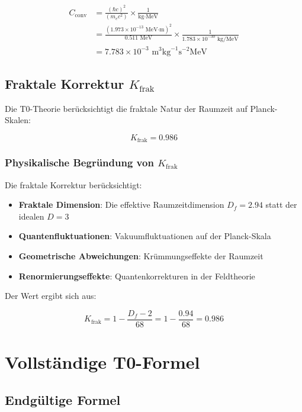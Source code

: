 \documentclass[12pt,a4paper]{article}
\newcommand{\Kfrak}{K_{\text{frak}}}
\newcommand{\Cconv}{C_{\text{conv}}}
\begin{document}
	\begin{align}
		\Cconv &= \frac{(\hbar c)^2}{(m_e c^2)} \times \frac{1}{\text{kg} \cdot \text{MeV}} \\
		&= \frac{(1.973 \times 10^{-13} \text{ MeV·m})^2}{0.511 \text{ MeV}} \times \frac{1}{1.783 \times 10^{-30} \text{ kg/MeV}} \\
		&= 7.783 \times 10^{-3} \text{ m}^3 \text{kg}^{-1} \text{s}^{-2} \text{MeV}
	\end{align}
	
	\subsection{Fraktale Korrektur $\Kfrak$}
	
	Die T0-Theorie berücksichtigt die fraktale Natur der Raumzeit auf Planck-Skalen:
	
	\begin{equation}
		\Kfrak = 0.986
	\end{equation}
	
	\subsubsection{Physikalische Begründung von $\Kfrak$}
	
	Die fraktale Korrektur berücksichtigt:
	
	\begin{itemize}
		\item \textbf{Fraktale Dimension}: Die effektive Raumzeitdimension $D_f = 2.94$ statt der idealen $D = 3$
		\item \textbf{Quantenfluktuationen}: Vakuumfluktuationen auf der Planck-Skala
		\item \textbf{Geometrische Abweichungen}: Krümmungseffekte der Raumzeit
		\item \textbf{Renormierungseffekte}: Quantenkorrekturen in der Feldtheorie
	\end{itemize}
	
	Der Wert ergibt sich aus:
	
	\begin{equation}
		\Kfrak = 1 - \frac{D_f - 2}{68} = 1 - \frac{0.94}{68} = 0.986
	\end{equation}
	
	\section{Vollständige T0-Formel}
	
	\subsection{Endgültige Formel}
	
\end{document}
